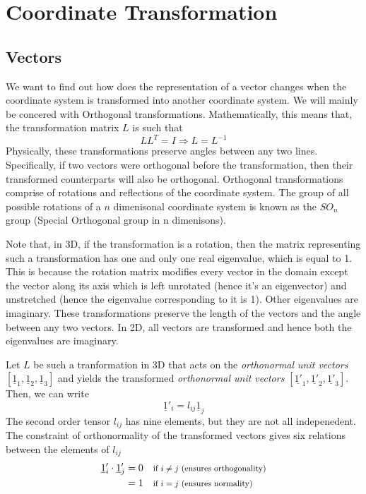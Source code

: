 \documentclass[11pt, letterpaper]{article}
\newcommand{\1}{\bm{1}}
\newcommand{\un}[1]{\underline{#1}}
\begin{document}
\section{Coordinate Transformation}

\subsection{Vectors}

We want to find out how does the representation of a vector changes when the coordinate system is transformed into another coordinate system. We will mainly be concered with Orthogonal transformations. Mathematically, this means that, the transformation matrix $L$ is such that
$$L L^T = I \Rightarrow L = L^{-1}$$
Physically, these transformations preserve angles between any two lines. Specifically, if two vectors were orthogonal before the transformation, then their transformed counterparts will also be orthogonal. Orthogonal transformations comprise of rotations and reflections of the coordinate system. The group of all possible rotations of a $n$ dimenisonal coordinate system is known as the $SO_n$ group (Special Orthogonal group in n dimenisons).

Note that, in 3D, if the transformation is a rotation, then the matrix representing such a transformation has one and only one real eigenvalue, which is equal to 1. This is because the rotation matrix modifies every vector in the domain except the vector along its axis which is left unrotated (hence it's an eigenvector) and unstretched (hence the eigenvalue corresponding to it is 1). Other eigenvalues are imaginary. These transformations preserve the length of the vectors and the angle between any two vectors. In 2D, all vectors are transformed and hence both the eigenvalues are imaginary.

Let $L$ be such a tranformation in 3D that acts on the \textit{orthonormal unit vectors} $[\un{1}_1,\un{1}_2,\un{1}_3]$ and yields the transformed \textit{orthonormal unit vectors} $[\un{1'}_1,\un{1'}_2,\un{1'}_3]$. Then, we can write
$$\un{1}'_i  = l_{ij}\un{1}_j$$
The second order tensor $l_{ij}$ has nine elements, but they are not all indepenedent. The constraint of orthonormality of the transformed vectors gives six relations between the elements of $l_{ij}$
\begin{align*}
\un{1}'_i \cdot \un{1}'_j &= 0 \text{\quad \footnotesize{if $i\neq j$ (ensures orthogonality)}}\\
&= 1 \text{\quad \footnotesize{if $i = j$ (ensures normality)}}
\end{align*}
\end{document}
